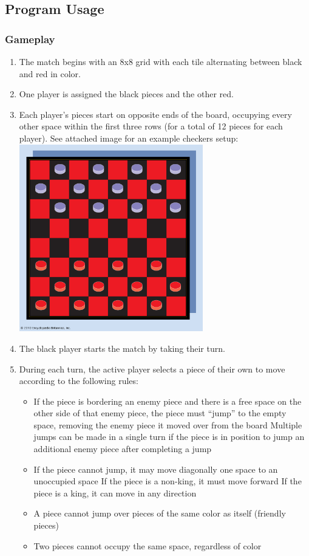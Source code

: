 \documentclass[10pt]{article}
\begin{document}
\subsection{Program Usage}
\subsubsection{Gameplay}
\begin{enumerate}[label*=G\arabic*.]
	\item The match begins with an 8x8 grid with each tile alternating between black and red in color.
	\item One player is assigned the black pieces and the other red.
	\item Each player’s pieces start on opposite ends of the board, occupying every other space within the first three rows (for a total of 12 pieces for each player).
	\subitem See attached image for an example checkers setup:
	\subitem \includegraphics[width=8cm]{board.png}
	\item The black player starts the match by taking their turn.
	\item During each turn, the active player selects a piece of their own to move according to the following rules:
\begin{itemize}
    \item If the piece is bordering an enemy piece and there is a free space on the other side of that enemy piece, the piece must “jump” to the empty space, removing the enemy piece it moved over from the board
        \subitem Multiple jumps can be made in a single turn if the piece is in position to jump an additional enemy piece after completing a jump
    \item If the piece cannot jump, it may move diagonally one space to an unoccupied space
        \subitem If the piece is a non-king, it must move forward
        \subitem If the piece is a king, it can move in any direction
    \item A piece cannot jump over pieces of the same color as itself (friendly pieces)
    \item Two pieces cannot occupy the same space, regardless of color
\end{itemize}


\end{enumerate}
\end{document}
